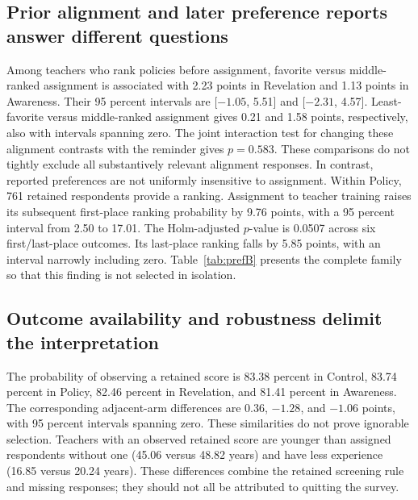 \subsection{Prior alignment and later preference reports answer different questions}
Among teachers who rank policies before assignment, favorite versus middle-ranked assignment is associated with 2.23 points in Revelation and 1.13 points in Awareness. Their 95 percent intervals are [$-1.05$, 5.51] and [$-2.31$, 4.57]. Least-favorite versus middle-ranked assignment gives 0.21 and 1.58 points, respectively, also with intervals spanning zero. The joint interaction test for changing these alignment contrasts with the reminder gives $p=0.583$. These comparisons do not tightly exclude all substantively relevant alignment responses.
In contrast, reported preferences are not uniformly insensitive to assignment. Within Policy, 761 retained respondents provide a ranking. Assignment to teacher training raises its subsequent first-place ranking probability by 9.76 points, with a 95 percent interval from 2.50 to 17.01. The Holm-adjusted $p$-value is 0.0507 across six first/last-place outcomes. Its last-place ranking falls by 5.85 points, with an interval narrowly including zero. Table~\ref{tab:prefB} presents the complete family so that this finding is not selected in isolation.

\subsection{Outcome availability and robustness delimit the interpretation}
The probability of observing a retained score is 83.38 percent in Control, 83.74 percent in Policy, 82.46 percent in Revelation, and 81.41 percent in Awareness. The corresponding adjacent-arm differences are 0.36, $-1.28$, and $-1.06$ points, with 95 percent intervals spanning zero. These similarities do not prove ignorable selection. Teachers with an observed retained score are younger than assigned respondents without one (45.06 versus 48.82 years) and have less experience (16.85 versus 20.24 years). These differences combine the retained screening rule and missing responses; they should not all be attributed to quitting the survey.

